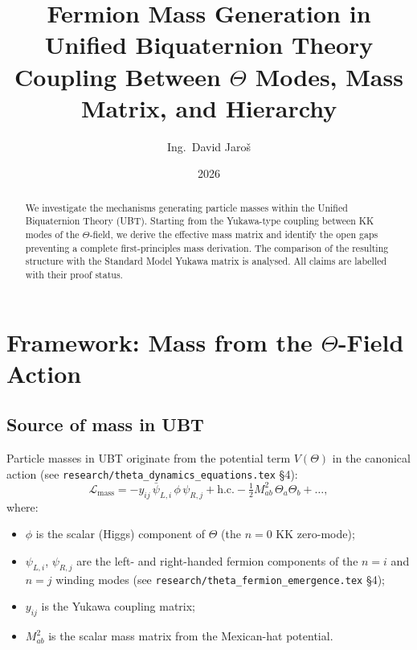 \documentclass[11pt,a4paper]{article}
\title{Fermion Mass Generation in Unified Biquaternion Theory\\
\large Coupling Between \texorpdfstring{$\Theta$}{Theta} Modes, Mass Matrix, and Hierarchy}
\author{Ing.\ David Jaroš}
\date{2026}
\begin{document}
\maketitle

\begin{abstract}
We investigate the mechanisms generating particle masses within the
Unified Biquaternion Theory (UBT).  Starting from the Yukawa-type coupling
between KK modes of the $\Theta$-field, we derive the effective mass matrix
and identify the open gaps preventing a complete first-principles mass
derivation.  The comparison of the resulting structure with the Standard
Model Yukawa matrix is analysed.  All claims are labelled with their proof
status.
\end{abstract}

\tableofcontents

\section{Framework: Mass from the \texorpdfstring{$\Theta$}{Theta}-Field Action}
\label{sec:framework}

\subsection{Source of mass in UBT}

Particle masses in UBT originate from the potential term $V(\Theta)$ in the
canonical action (see \texttt{research/theta\_dynamics\_equations.tex} §4):
\begin{equation}
\label{eq:yukawa_lag}
  \mathcal{L}_{\mathrm{mass}}
  = -y_{ij}\,\bar\psi_{L,i}\,\phi\,\psi_{R,j} + \mathrm{h.c.}
    - \tfrac{1}{2} M^2_{ab}\,\Theta_a\Theta_b + \ldots,
\end{equation}
where:
\begin{itemize}
  \item $\phi$ is the scalar (Higgs) component of $\Theta$ (the $n=0$ KK zero-mode);
  \item $\psi_{L,i}$, $\psi_{R,j}$ are the left- and right-handed fermion
        components of the $n=i$ and $n=j$ winding modes (see
        \texttt{research/theta\_fermion\_emergence.tex} §4);
  \item $y_{ij}$ is the Yukawa coupling matrix;
  \item $M^2_{ab}$ is the scalar mass matrix from the Mexican-hat potential.
\end{itemize}
\end{document}
